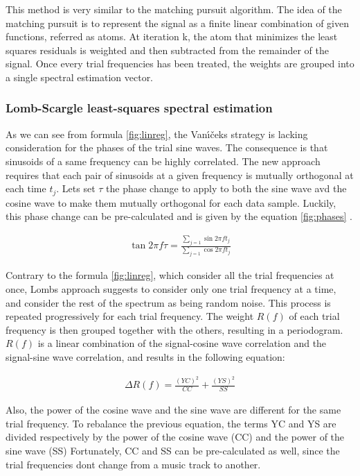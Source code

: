 \documentclass[letterpaper]{article}
\begin{document}
This method is very similar to the matching pursuit algorithm. The idea of the matching pursuit is to represent the signal as a finite linear combination of given
functions, referred as atoms. At iteration k, the atom that minimizes the least squares residuals is weighted and then subtracted from 
the remainder of the signal. Once every trial frequencies has been treated, the weights are grouped into a single spectral estimation vector.

\subsubsection{Lomb-Scargle least-squares spectral estimation}

As we can see from formula \ref{fig:linreg}, the Van\'{\i}\v{c}ek\textquotesingle s strategy is lacking consideration for the phases of the trial sine waves.
The consequence is that sinusoids of a same frequency can be highly correlated. The new approach requires that each pair of sinusoids at a given frequency
is mutually orthogonal at each time $t_{j}$. Let\textquotesingle s set $\tau$ the phase change to apply to both the sine wave avd the cosine wave to make
them mutually orthogonal for each data sample. Luckily, this phase change can be pre-calculated and is given by the equation \ref{fig:phases} \citep{LS}.

\begin{align}
\tan 2\pi f \tau = \frac{\sum\limits_{j=1} \sin 2\pi f t_{j}}{\sum\limits_{j=1} \cos 2\pi f t_{j}}
\label{fig:phases}
\end{align}

Contrary to the formula \ref{fig:linreg}, which consider all the trial frequencies at once, Lomb\textquotesingle s approach suggests to consider only one
trial frequency at a time, and consider the rest of the spectrum as being random noise. This process is repeated progressively for each trial frequency. The weight $R(f)$ of each trial frequency is then grouped together with the others, resulting in a periodogram. $R(f)$ is a linear combination of
the signal-cosine wave correlation and the signal-sine wave correlation, and results in the following equation:

\begin{align}
\Delta R(f) = \frac{(YC)^{2}}{CC} 
+ \frac{(YS)^{2}}{SS}
\label{fig:ccss}
\end{align}

Also, the power of the cosine wave and the sine wave are different for the same trial frequency. To rebalance the previous equation, the terms YC and YS
are divided respectively by the power of the cosine wave (CC) and the power of the sine wave (SS)
Fortunately, CC and SS can be pre-calculated as well, since the trial frequencies don\textquotesingle t change from a music track to another.
\end{document}
